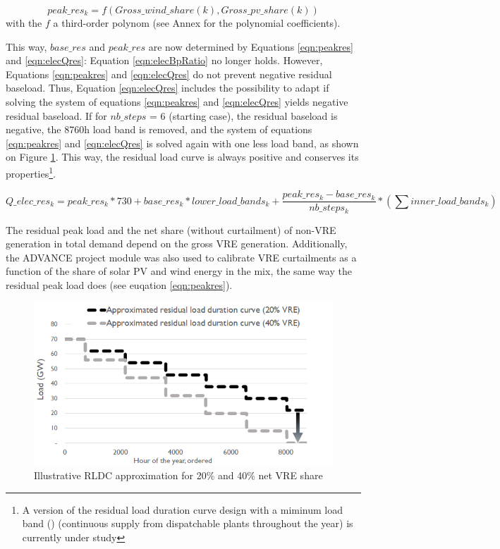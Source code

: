 \begin{dmath}
    {peak\_res_k} = f(Gross\_wind\_share(k),Gross\_pv\_share(k))
    \label{eqn:peakres}
\end{dmath}
with the $f$ a third-order polynom (see Annex for the polynomial coefficients).


This way, $base\_res$ and $peak\_res$ are now determined by Equations \ref{eqn:peakres} and \ref{eqn:elecQres}: Equation \ref{eqn:elecBpRatio} no longer holds. However, Equations \ref{eqn:peakres} and \ref{eqn:elecQres} do not prevent negative residual baseload. Thus, Equation \ref{eqn:elecQres} includes the possibility to adapt if solving the system of equations \ref{eqn:peakres} and \ref{eqn:elecQres} yields negative residual baseload. If for  $nb\_steps$ = 6 (starting case), the residual baseload is negative, the 8760h load band is removed, and the system of equations \ref{eqn:peakres} and \ref{eqn:elecQres} is solved again with one less load band, as shown on Figure \ref{fig:RLDCapprox}. This way, the residual load curve is always positive and conserves its properties\footnote{A version of the residual load duration curve design with a miminum load band (\cite{Ueckerdt2015}) (continuous supply from dispatchable plants throughout the year) is currently under study}.


\begin{dmath}
    Q\_elec\_res_k =
    {peak\_res_k} * 730 +
    {base\_res_k} * {lower\_load\_bands_k} +
    \frac{peak\_res_k - base\_res_k}{nb\_steps_k} * ( \sum inner\_load\_bands_k)
    \label{eqn:elecQres}
\end{dmath}


The residual peak load and the net share (without curtailment) of non-VRE generation in total demand depend on the gross VRE generation. Additionally, the ADVANCE project module was also used to calibrate VRE curtailments as a function of the share of solar PV and wind energy in the mix, the same way the residual peak load does (see euqation \ref{eqn:peakres}). %
\begin{figure}[H]
    \includegraphics[scale=0.8]{figures&tables/LDC&RLDC.png}
    \centering
    \caption{Illustrative RLDC approximation for 20\% and 40\% net VRE share}
    \label{fig:RLDCapprox}
\end{figure}

